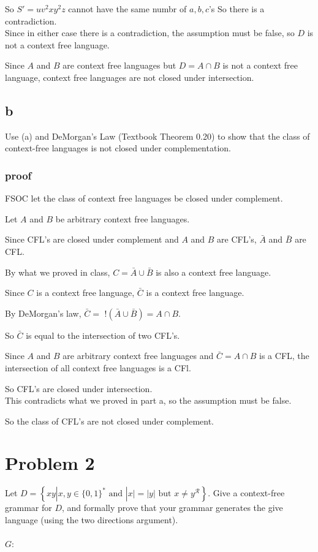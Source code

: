 \documentclass[letterpaper, 11pt]{article}
\begin{document}
So $S' = uv^2xy^2z$ cannot have the same numbr of $a,b,c$'s
So there is a contradiction.\\

Since in either case there is a contradiction, the assumption must be false, so $D$ is not a context free language.

Since $A$ and $B$ are context free languages but $D = A \cap B$ is not a context free language, context free languages are not closed under intersection.

\subsection*{b}
Use (a) and DeMorgan’s Law (Textbook Theorem 0.20) to show that the class of context-free languages is not closed under complementation.

\subsubsection*{proof}
FSOC let the class of context free languages be closed under complement.

Let $A$ and $B$ be arbitrary context free languages.

Since CFL's are closed under complement and $A$ and $B$ are CFL's, $\bar{A}$ and $\bar{B}$ are CFL.

By what we proved in class, $C = \bar{A} \cup \bar{B}$ is also a context free language.

Since $C$ is a context free language, $\bar{C}$ is a context free language.

By DeMorgan's law, $\bar{C} =$ $!(\bar{A} \cup \bar{B}) = A \cap B$.

So $\bar{C}$ is equal to the intersection of two CFL's.

Since $A$ and $B$ are arbitrary context free languages and $\bar{C} = A \cap B$ is a CFL, the intersection of all context free languages is a CFl.

So CFL's are closed under intersection.\\

This contradicts what we proved in part a, so the assumption must be false.

So the class of CFL's are not closed under complement.
\newpage

\section*{Problem 2}
Let $D = \left\{ x y \left| x , y \in \{ 0,1 \} ^ { * } \text { and } \right| x | = | y | \text { but } x \neq y ^ { \mathcal { R } } \right\}$.
Give a context-free grammar for $D$, and formally prove that your grammar generates the give language (using the two directions argument).\\\\
$G$:
\end{document}
